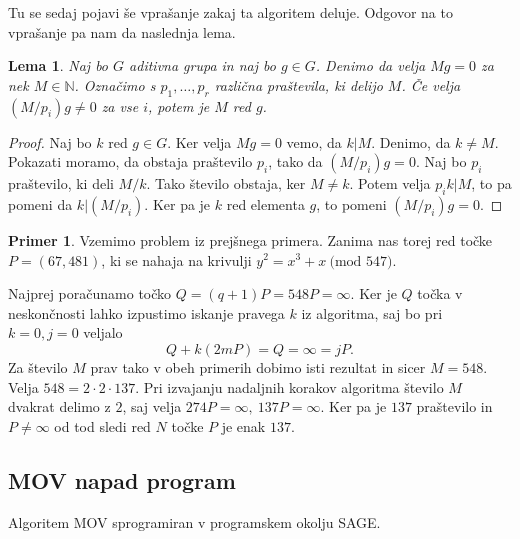 \documentclass[12pt,a4paper,twoside]{article}
\theoremstyle{definition} %
\newtheorem{primer}[definicija]{Primer}
\theoremstyle{plain} %
\newtheorem{lema}[definicija]{Lema}
\numberwithin{equation}{section}  %
\newcommand{\N}{\mathbb N}
\newcommand{\MOD}[1]{\ \text{(mod }{#1}\text{)}}
\begin{document}
Tu se sedaj pojavi še vprašanje zakaj ta algoritem deluje. Odgovor na to vprašanje pa nam da naslednja lema.

\begin{lema}

Naj bo $G$ aditivna grupa in naj bo $g\in G$. Denimo da velja $Mg = 0$ za nek $M \in \N$. Označimo s $p_1,\ldots,p_r$ različna praštevila, ki delijo $M$. Če velja $(M/p_i)g \neq  0$ za vse $i$, potem je $M$ red $g$.

\end{lema}

\begin{proof}
Naj bo $k$ red $g\in G$. Ker velja $Mg = 0$ vemo, da $k|M$. Denimo, da $k \neq M$. Pokazati moramo, da obstaja praštevilo $p_i$, tako da $(M/p_i)g = 0$. Naj bo $p_i$ praštevilo, ki deli $M/k$. Tako število obstaja, ker $M \neq k$. Potem velja $p_ik|M$, to pa pomeni da $k|(M/p_i)$. Ker pa je $k$ red elementa $g$, to pomeni $(M/p_i)g = 0$.

\end{proof}


\begin{primer}
Vzemimo problem iz prejšnega primera. Zanima nas torej red točke \newline $P=(67,481)$, ki se nahaja na krivulji $y^2 = x^3+x \MOD{547}$.

Najprej poračunamo točko $Q = (q+1)P = 548P = \infty$. Ker je $Q$ točka v neskončnosti lahko izpustimo iskanje pravega $k$ iz algoritma, saj bo pri $k=0,j=0$ veljalo
$$Q+k(2mP) = Q =  \infty = jP.$$
Za število $M$ prav tako v obeh primerih dobimo isti rezultat in sicer $M = 548$. Velja $548=2\cdot 2\cdot 137$. Pri izvajanju nadaljnih korakov algoritma število $M$ dvakrat delimo z $2$, saj velja $274P = \infty, \ 137P = \infty$. Ker pa je $137$ praštevilo in $P \neq \infty$ od tod sledi red $N$ točke $P$ je enak $137$.

\end{primer}


\subsection{MOV napad program}

Algoritem MOV sprogramiran v programskem okolju SAGE.



\newpage
\end{document}

